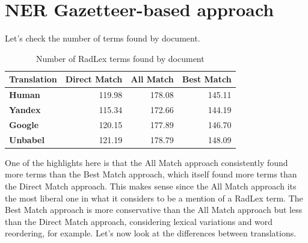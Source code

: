 \label{chap4}





\section{NER Gazetteer-based approach}

Let's check the number of terms found by document.


\begin{table}[ht]
\centering
\begin{tabular}{lrrr}
\toprule
\textbf{Translation}   &   \textbf{Direct Match} &   \textbf{All Match} &   \textbf{Best Match} \\
\midrule
 \textbf{Human}         &         119.98 &      178.08 &       145.11 \\
 
 \textbf{Yandex}        &         115.34 &      172.66 &       144.19 \\
 
 \textbf{Google}        &         120.15 &      177.89 &       146.70 \\
 
 \textbf{Unbabel}       &         121.19 &      178.79 &       148.09 \\
 
\bottomrule
\end{tabular} 
\caption{Number of RadLex terms found by document}
\label{table:terms_by_document}
\end{table}

One of the highlights here is that the All Match approach consistently found more terms than the Best Match approach, which itself found more terms than the Direct Match approach. This makes sense since the All Match approach its the most liberal one in what it considers to be a mention of a RadLex term. The Best Match approach is more conservative than the All Match approach but less than the Direct Match approach, considering lexical variations and word reordering, for example. Let's now look at the differences between translations.

